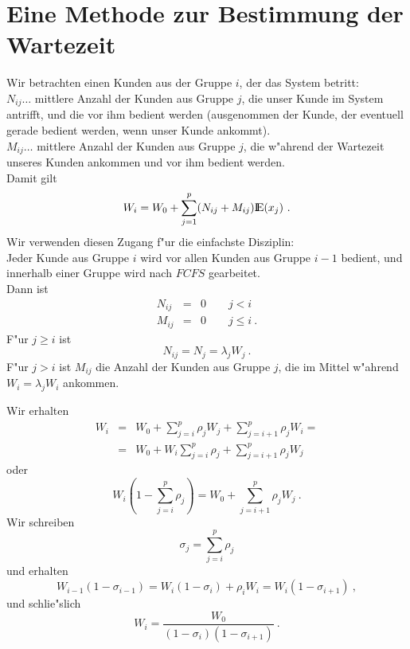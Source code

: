 \section{Eine Methode zur Bestimmung der Wartezeit} 

Wir betrachten einen Kunden aus der Gruppe $i$, der das System betritt: \\
$N_{ij} \dots$ mittlere Anzahl der Kunden aus Gruppe $j$, die unser Kunde im System antrifft, und die vor ihm bedient werden (ausgenommen der Kunde, der eventuell
gerade bedient werden, wenn unser Kunde ankommt). \\
$M_{ij} \dots$ mittlere Anzahl der Kunden aus Gruppe $j$, die w"ahrend der Wartezeit unseres Kunden ankommen und vor ihm bedient werden. \\
Damit gilt
\[W_{i}=W_{0}+\sum_{j=1}^{p}(N_{ij}+M_{ij}){\rm I\kern-0.2em E}(x_{j}) ~.  \]
Wir verwenden diesen Zugang f"ur die einfachste Disziplin: \\
Jeder Kunde aus Gruppe $i$ wird vor allen Kunden aus Gruppe $i-1$ bedient, und innerhalb einer Gruppe wird nach $FCFS$ gearbeitet. \\
Dann ist
\begin{eqnarray*}
N_{ij}&=&0 \qquad j<i \\
M_{ij}&=&0 \qquad j \leq i ~.
\end{eqnarray*}
F"ur $j \geq i$ ist
\[N_{ij}=N_{j}=\lambda _{j}W_{j} ~. \]
F"ur $j>i$ ist $M_{ij}$ die Anzahl der Kunden aus Gruppe $j$, die im Mittel w"ahrend $W_{i} = \lambda _{j}W_{i}$ ankommen.

Wir erhalten
\begin{eqnarray*}
W_{i}&=&W_{0}+\sum_{j=i}^{p}\rho _{j}W_{j}+\sum_{j=i+1}^{p}\rho_{j}W_{i} = \\
&=&W_{0} + W_{i}\sum_{j=i}^{p}\rho_{j} + \sum_{j=i+1}^{p}\rho_{j}W_{j}
\end{eqnarray*}
oder 
\[W_{i}(1-\sum_{j=i}^{p}\rho_{j})=W_{0}+\sum_{j=i+1}^{p}\rho_{j}W_{j} ~. \]
Wir schreiben
\[\sigma_{j} = \sum_{j=i}^{p}\rho_{j}  \]
und erhalten
\[W_{i-1}(1-\sigma_{i-1})=W_{i}(1-\sigma_{i})+\rho_{i}W_{i}=W_{i}(1-\sigma_{i+1}) ~, \]
und schlie"slich
\[W_{i}=\frac{W_{0}}{(1-\sigma_{i})(1-\sigma_{i+1})} ~. \]

